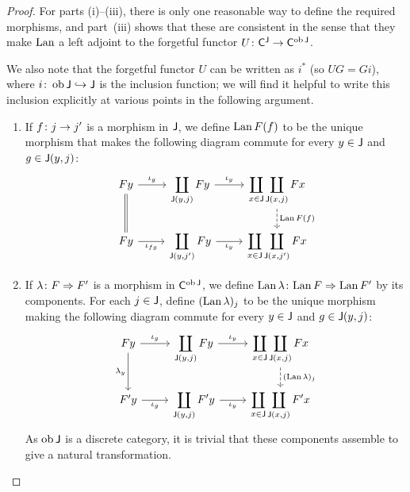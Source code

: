 \documentclass[../../solutions]{subfiles}
\begin{document}
\begin{proof}
  For parts (i)--(iii), there is only one reasonable way to define the
  required morphisms, and part~(iii) shows that these are consistent
  in the sense that they make $\operatorname{Lan}$ a left adjoint to the forgetful
  functor ${U}\colon{{\mathsf{C}}^{\mathsf{J}}}\to{{\mathsf{C}}^{\operatorname{ob}{\mathsf{J}}}}$.

  We also note that the forgetful functor $U$ can be written as $i^*$
  (so $UG=Gi$), where $i\colon \operatorname{ob}{\mathsf{J}}\hookrightarrow {\mathsf{J}}$ is the
  inclusion function; we will find it helpful to write this inclusion
  explicitly at various points in the following argument.

  \begin{enumerate}[label=(\roman*)]
  \item If ${f}\colon{j}\to{j'}$ is a morphism in ${\mathsf{J}}$, we define
    $\operatorname{Lan} F(f)$ to be the unique morphism that makes the following
    diagram commute for every $y\in{\mathsf{J}}$ and $g\in{\mathsf{J}}(y,j)$:
    $$
    \begin{tikzcd}
      Fy \ar[r, "\iota_g"] \ar[d, equal]
      & \displaystyle \coprod_{\sJ(y,j)} Fy \ar[r, "\iota_y"]
      & \displaystyle \coprod_{x\in\sJ\vphantom{j}}\coprod_{\sJ(x,j)} Fx
      \ar[d, dashed, "\Lan F(f)"]
      \\
      Fy \ar[r, "\iota_{fg}"']
      & \displaystyle \coprod_{\sJ(y,j')} Fy \ar[r, "\iota_y"']
      & \displaystyle \coprod_{x\in\sJ\vphantom{j}}\coprod_{\sJ(x,j')} Fx
    \end{tikzcd}
    $$

  \item If ${\lambda}\colon{F}\Rightarrow{F'}$ is a morphism in ${\mathsf{C}}^{\operatorname{ob}{\mathsf{J}}}$, we
    define ${\operatorname{Lan}\lambda}\colon{\operatorname{Lan}F}\Rightarrow{\operatorname{Lan}F'}$ by its components.
    For each $j\in{\mathsf{J}}$, define $(\operatorname{Lan}\lambda)_j$ to be the unique
    morphism making the following diagram commute for every $y\in{\mathsf{J}}$
    and $g\in{\mathsf{J}}(y,j)$:
    $$
    \begin{tikzcd}
      Fy \ar[r, "\iota_g"] \ar[d, "\lambda_y"']
      & \displaystyle \coprod_{\sJ(y,j)} Fy \ar[r, "\iota_y"]
      & \displaystyle \coprod_{x\in\sJ\vphantom{j}}\coprod_{\sJ(x,j)} Fx
      \ar[d, dashed, "(\Lan \lambda)_j"]
      \\
      F'y \ar[r, "\iota_g"']
      & \displaystyle \coprod_{\sJ(y,j)} F'y \ar[r, "\iota_y"']
      & \displaystyle \coprod_{x\in\sJ\vphantom{j}}\coprod_{\sJ(x,j)} F'x
    \end{tikzcd}
    $$
    As $\operatorname{ob}{\mathsf{J}}$ is a discrete category, it is trivial that these
    components assemble to give a natural transformation.


\end{enumerate}
\end{proof}
\end{document}
